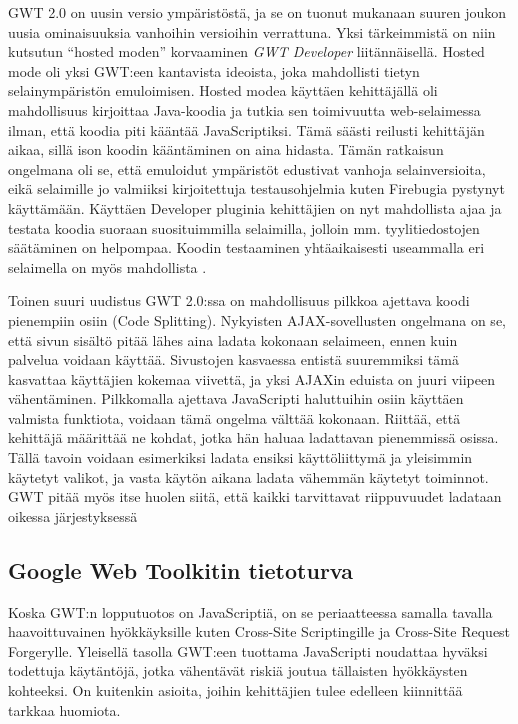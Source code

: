 GWT 2.0 on uusin versio ympäristöstä, ja se on tuonut mukanaan suuren joukon uusia ominaisuuksia vanhoihin versioihin verrattuna. Yksi tärkeimmistä on niin kutsutun ``hosted moden'' 
korvaaminen \emph{GWT Developer} liitännäisellä. Hosted mode oli yksi GWT:een kantavista ideoista, joka mahdollisti tietyn selainympäristön emuloimisen. Hosted modea käyttäen 
kehittäjällä oli mahdollisuus kirjoittaa Java-koodia ja tutkia sen toimivuutta web-selaimessa ilman, että koodia piti kääntää JavaScriptiksi. Tämä säästi reilusti kehittäjän aikaa, sillä 
ison koodin kääntäminen on aina hidasta. Tämän ratkaisun ongelmana oli se, että emuloidut ympäristöt edustivat vanhoja selainversioita, eikä selaimille jo valmiiksi kirjoitettuja 
testausohjelmia kuten Firebugia pystynyt käyttämään. Käyttäen Developer pluginia kehittäjien on nyt mahdollista ajaa ja testata koodia suoraan suosituimmilla selaimilla, jolloin mm.
tyylitiedostojen säätäminen on helpompaa. Koodin testaaminen yhtäaikaisesti useammalla eri selaimella on myös mahdollista \cite{GWTnew}. 

Toinen suuri uudistus GWT 2.0:ssa on mahdollisuus pilkkoa ajettava koodi pienempiin osiin (Code Splitting). Nykyisten AJAX-sovellusten ongelmana on se, että sivun sisältö pitää lähes aina 
ladata kokonaan selaimeen, ennen kuin palvelua voidaan käyttää. Sivustojen kasvaessa entistä suuremmiksi tämä kasvattaa käyttäjien kokemaa viivettä, ja yksi AJAXin eduista on juuri
viipeen vähentäminen. Pilkkomalla ajettava JavaScripti haluttuihin osiin käyttäen valmista funktiota, voidaan tämä ongelma välttää kokonaan. Riittää, että kehittäjä määrittää ne kohdat, 
jotka hän haluaa ladattavan pienemmissä osissa. Tällä tavoin voidaan esimerkiksi ladata ensiksi käyttöliittymä ja yleisimmin käytetyt valikot, ja vasta käytön aikana ladata vähemmän 
käytetyt toiminnot. GWT pitää myös itse huolen siitä, että kaikki tarvittavat riippuvuudet ladataan oikessa järjestyksessä \cite{GWTnew}

\subsection{Google Web Toolkitin tietoturva}

Koska GWT:n lopputuotos on JavaScriptiä, on se periaatteessa samalla tavalla haavoittuvainen hyökkäyksille kuten Cross-Site Scriptingille ja Cross-Site Request Forgerylle. Yleisellä tasolla 
GWT:een tuottama JavaScripti noudattaa hyväksi todettuja käytäntöjä, jotka vähentävät riskiä joutua tällaisten hyökkäysten kohteeksi. On kuitenkin asioita, joihin kehittäjien tulee edelleen
kiinnittää tarkkaa huomiota. 

